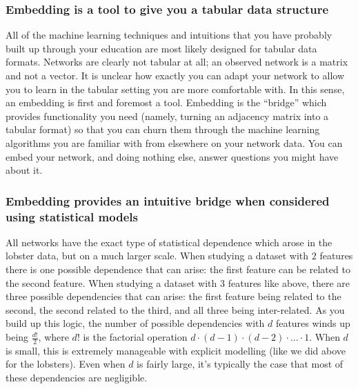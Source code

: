 \subsubsection{Embedding is a tool to give you a tabular data structure}

All of the machine learning techniques and intuitions that you have probably built up through your education are most likely designed for tabular data formats. Networks are clearly not tabular at all; an observed network is a matrix and not a vector. It is unclear how exactly you can adapt your network to allow you to learn in the tabular setting you are more comfortable with. In this sense, an embedding is first and foremost a tool. Embedding is the ``bridge'' which provides functionality you need (namely, turning an adjacency matrix into a tabular format) so that you can churn them through the machine learning algorithms you are familiar with from elsewhere on your network data. You can embed your network, and doing nothing else, answer questions you might have about it. 

\subsubsection{Embedding provides an intuitive bridge when considered using statistical models}

All networks have the exact type of statistical dependence which arose in the lobster data, but on a much larger scale. When studying a dataset with $2$ features there is one possible dependence that can arise: the first feature can be related to the second feature. When studying a dataset with $3$ features like above, there are three possible dependencies that can arise: the first feature being related to the second, the second related to the third, and all three being inter-related. As you build up this logic, the number of possible dependencies with $d$ features winds up being $\frac{d!}{2}$, where $d!$ is the factorial operation $d\cdot (d - 1) \cdot (d - 2) \cdot ... \cdot 1$. When $d$ is small, this is extremely manageable with explicit modelling (like we did above for the lobsters). Even when $d$ is fairly large, it's typically the case that most of these dependencies are negligible.

